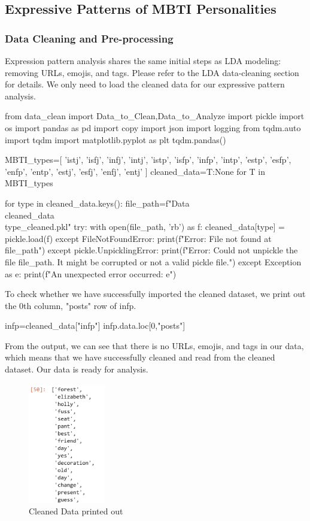 \documentclass[12pt]{article}
\numberwithin{figure}{section}  %
\begin{document}
	\subsection{Expressive Patterns of MBTI Personalities}
	\subsubsection{Data Cleaning and Pre-processing}
	Expression pattern analysis shares the same initial steps as LDA modeling:
	removing URLs, emojis, and tags. Please refer to the LDA data-cleaning %
	section for details. We only need to load the cleaned data for our
	expressive pattern analysis.
	\begin{python}
from data_clean import Data_to_Clean,Data_to_Analyze
import pickle
import os
import pandas as pd
import copy
import json
import logging
from tqdm.auto import tqdm
import matplotlib.pyplot as plt
tqdm.pandas()

MBTI_types=[
    'istj', 'isfj', 'infj', 'intj', 
    'istp', 'isfp', 'infp', 'intp', 
    'estp', 'esfp', 'enfp', 'entp', 
    'estj', 'esfj', 'enfj', 'entj'
    ]
cleaned_data={T:None for T in MBTI_types}

for type in cleaned_data.keys():
    file_path=f"Data\\cleaned_data\\{type}_cleaned.pkl" 
    try:
        with open(file_path, 'rb') as f:
            cleaned_data[type] = pickle.load(f)
    except FileNotFoundError:
        print(f"Error: File not found at {file_path}")
    except pickle.UnpicklingError:
        print(f"Error: Could not unpickle the file {file_path}. It might be corrupted or not a valid pickle file.")
    except Exception as e:
        print(f"An unexpected error occurred: {e}")
	\end{python}
	
	To check whether we have successfully imported the cleaned dataset, we print
	out the 0th column,  "posts" row of infp. %
	\begin{python}
infp=cleaned_data["infp"]
infp.data.loc[0,"posts"]
	\end{python}
	
	From the output, we can see that there is no URLs, emojis, and tags in our
	data, which means that we have successfully cleaned and read from the
	cleaned dataset. Our data is ready for analysis.
	\begin{figure}[H]
		\centering
		\includegraphics[width=0.3\textwidth]{Q2VADER1} 
		\caption{Cleaned Data printed out}		
	\end{figure}
	
\end{document}
